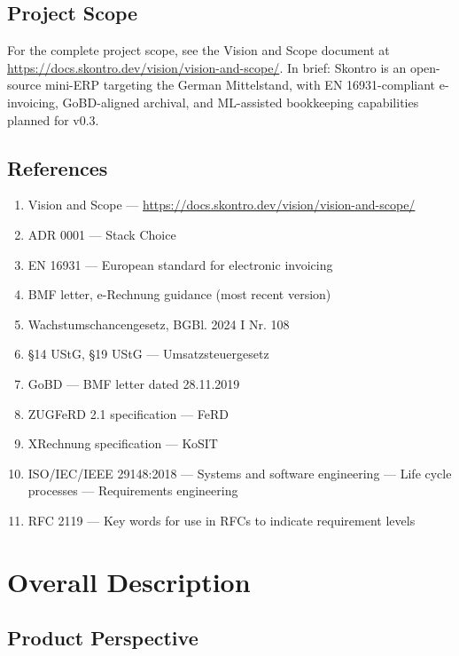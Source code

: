 \documentclass[11pt,a4paper]{article}
\begin{document}
\subsection{Project Scope}

For the complete project scope, see the Vision and Scope document at \url{https://docs.skontro.dev/vision/vision-and-scope/}. In brief: Skontro is an open-source mini-ERP targeting the German Mittelstand, with EN 16931-compliant e-invoicing, GoBD-aligned archival, and ML-assisted bookkeeping capabilities planned for v0.3.

\subsection{References}

\begin{enumerate}
    \item Vision and Scope --- \url{https://docs.skontro.dev/vision/vision-and-scope/}
    \item ADR 0001 --- Stack Choice
    \item EN 16931 --- European standard for electronic invoicing
    \item BMF letter, e-Rechnung guidance (most recent version)
    \item Wachstumschancengesetz, BGBl. 2024 I Nr. 108
    \item \S14 UStG, \S19 UStG --- Umsatzsteuergesetz
    \item GoBD --- BMF letter dated 28.11.2019
    \item ZUGFeRD 2.1 specification --- FeRD
    \item XRechnung specification --- KoSIT
    \item ISO/IEC/IEEE 29148:2018 --- Systems and software engineering --- Life cycle processes --- Requirements engineering
    \item RFC 2119 --- Key words for use in RFCs to indicate requirement levels
\end{enumerate}

\section{Overall Description}

\subsection{Product Perspective}
\end{document}
